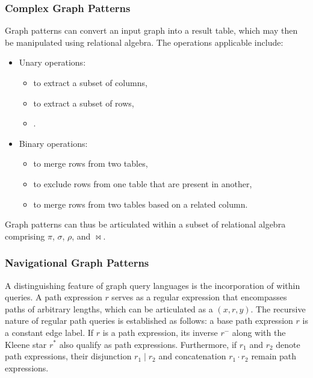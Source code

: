 \subsubsection{Complex Graph Patterns}
Graph patterns can convert an input graph into a result table, which may then be manipulated using relational algebra. The operations applicable include:
\begin{itemize}
    \item Unary operations:
    \begin{itemize}
        \item {} to extract a subset of columns,
        \item {} to extract a subset of rows,
        \item {}.
    \end{itemize}
    \item Binary operations:
    \begin{itemize}
        \item {} to merge rows from two tables,
        \item {} to exclude rows from one table that are present in another,
        \item {} to merge rows from two tables based on a related column.
    \end{itemize}
\end{itemize}
Graph patterns can thus be articulated within a subset of relational algebra comprising $\pi$, $\sigma$, $\rho$, and $\bowtie$.

\subsubsection{Navigational Graph Patterns}
A distinguishing feature of graph query languages is the incorporation of  within queries. A path expression $r$ serves as a regular expression that encompasses paths of arbitrary lengths, which can be articulated as a  $(x,r,y)$. The recursive nature of regular path queries is established as follows: a base path expression $r$ is a constant edge label. If $r$ is a path expression, its inverse $r^-$ along with the Kleene star $r^*$ also qualify as path expressions. Furthermore, if $r_1$ and $r_2$ denote path expressions, their disjunction $r_1 \mid r_2$ and concatenation $r_1 \cdot r_2$ remain path expressions.

